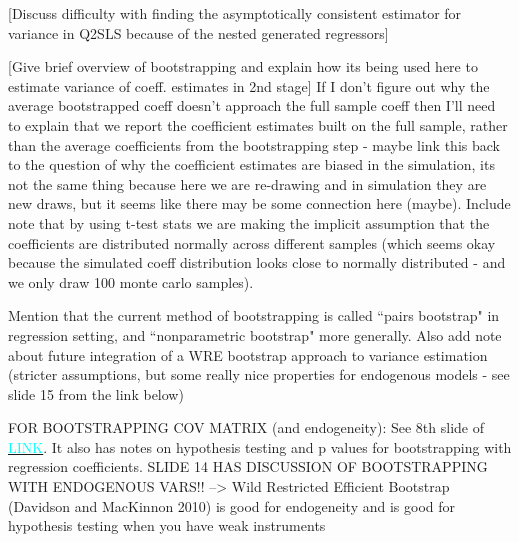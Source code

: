 \documentclass[12pt]{article}
\begin{document}
\textcolor{BrickRed}{[Discuss difficulty with finding the asymptotically consistent estimator for variance in Q2SLS because of the nested generated regressors]}

\textcolor{BrickRed}{[Give brief overview of bootstrapping and explain how its being used here to estimate variance of coeff. estimates in 2nd stage]} If I don't figure out why the average bootstrapped coeff doesn't approach the full sample coeff then I'll need to explain that we report the coefficient estimates built on the full sample, rather than the average coefficients from the bootstrapping step - maybe link this back to the question of why the coefficient estimates are biased in the simulation, its not the same thing because here we are re-drawing and in simulation they are new draws, but it seems like there may be some connection here (maybe). Include note that by using t-test stats we are making the implicit assumption that the coefficients are distributed normally across different samples (which seems okay because the simulated coeff distribution looks close to normally distributed - and we only draw 100 monte carlo samples).

Mention that the current method of bootstrapping is called ``pairs bootstrap" in regression setting, and ``nonparametric bootstrap" more generally. Also add note about future integration of a WRE bootstrap approach to variance estimation (stricter assumptions, but some really nice properties for endogenous models - see slide 15 from the link below)

\textcolor{BrickRed}{FOR BOOTSTRAPPING COV MATRIX (and endogeneity):} See 8th slide of \href{https://www.math.kth.se/matstat/gru/sf2930/papers/wild.bootstrap.pdf}{\textcolor{cyan}{LINK}}. It also has notes on hypothesis testing and p values for bootstrapping with regression coefficients. SLIDE 14 HAS DISCUSSION OF BOOTSTRAPPING WITH ENDOGENOUS VARS!! --> Wild Restricted Efficient Bootstrap (Davidson and MacKinnon 2010) is good for endogeneity and is good for hypothesis testing when you have weak instruments

\end{document}

